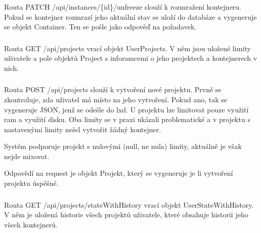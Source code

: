 \documentclass[a4paper,oneside,12pt]{report}
\begin{document}
\subsubsection{}

Routa PATCH  /api/instances/\{id\}/unfreeze slouží k rozmražení kontejneru.
Pokud se kontejner rozmrazí jeho aktuální stav se uloží do databáze a vygeneruje se objekt Container.
Ten se pošle jako odpověď na požadavek.


\subsubsection{\color{apiblue}{GET -- /api/projects}}

Routa GET /api/projects vrací objekt UserProjects.
V něm jsou uložené limity uživatele a pole objektů Project s inforamcemi o jeho projektech a kontejnerech v nich.

\subsubsection{\color{apigreen}{POST -- /api/projects}}

Routa POST /api/projects slouží k vytvoření nové projektu.
Prvně se zkontroluje, zda uživatel má místo na jeho vytvoření.
Pokud ano, tak se vygeneruje JSON, jenž se odešle do lxd.
U projektu lze limitovat pouze využití ram a využití disku.
Oba limity se v praxi ukázali problematické a v projektu s nastavenými limity nešel vytvořit žádný kontejner.

Systém podporuje projekt s nulovými (null, ne nula) limity, aktuálně je však nejde mixovat.

Odpovědí na request je objekt Projekt, který se vygeneruje je li vytvoření projektu úspěšné.

\subsubsection{\color{apiblue}{GET -- /api/projects/stateWithHistory}}

Routa GET /api/projects/stateWithHistory vrací objekt UserStateWithHistory.
V něm je uložená historie všech projektů uživatele, které obsahuje historii jeho všech kontejnerů.

\subsubsection{}
\end{document}
